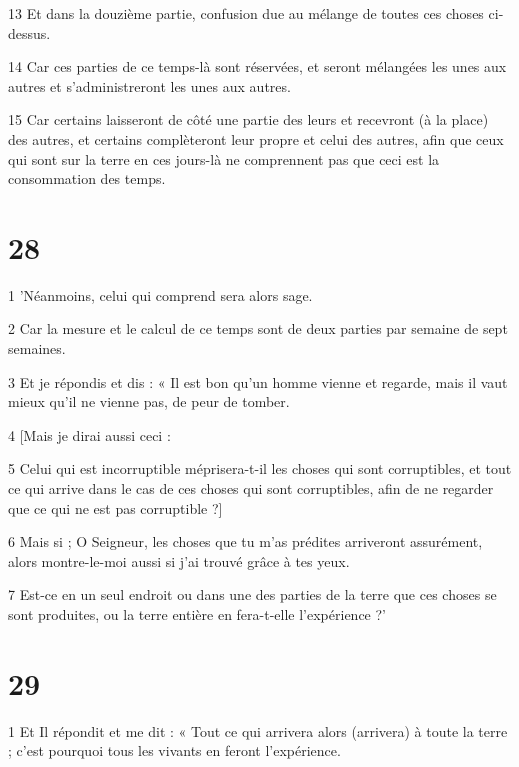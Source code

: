\par 13 Et dans la douzième partie, confusion due au mélange de toutes ces choses ci-dessus.

\par 14 Car ces parties de ce temps-là sont réservées, et seront mélangées les unes aux autres et s'administreront les unes aux autres.

\par 15 Car certains laisseront de côté une partie des leurs et recevront (à la place) des autres, et certains complèteront leur propre et celui des autres, afin que ceux qui sont sur la terre en ces jours-là ne comprennent pas que ceci est la consommation des temps.

\chapter{28}

\par 1 'Néanmoins, celui qui comprend sera alors sage.

\par 2 Car la mesure et le calcul de ce temps sont de deux parties par semaine de sept semaines.

\par 3 Et je répondis et dis : « Il est bon qu'un homme vienne et regarde, mais il vaut mieux qu'il ne vienne pas, de peur de tomber.

\par 4 [Mais je dirai aussi ceci :

\par 5 Celui qui est incorruptible méprisera-t-il les choses qui sont corruptibles, et tout ce qui arrive dans le cas de ces choses qui sont corruptibles, afin de ne regarder que ce qui ne est pas corruptible ?]

\par 6 Mais si ; O Seigneur, les choses que tu m'as prédites arriveront assurément, alors montre-le-moi aussi si j'ai trouvé grâce à tes yeux.

\par 7 Est-ce en un seul endroit ou dans une des parties de la terre que ces choses se sont produites, ou la terre entière en fera-t-elle l'expérience ?'

\chapter{29}

\par 1 Et Il répondit et me dit : « Tout ce qui arrivera alors (arrivera) à toute la terre ; c'est pourquoi tous les vivants en feront l'expérience.

